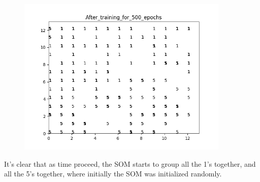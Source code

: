 \documentclass[11pt]{article}
\begin{document}
\begin{enumerate}
\begin{enumerate}
\begin{figure}[h!]
\begin{minipage}{0.45\textwidth}
    \end{minipage}\hfill
    \begin{minipage}{0.45\textwidth}
    	\centering
         \includegraphics[width=0.9\textwidth]{After_training_for_500_epochs}
    \end{minipage}\hfill
\end{figure}
It's clear that as time proceed, the SOM starts to group all the 1's together, and all the 5's together, where initially the SOM was initialized randomly.


\end{enumerate}
\end{enumerate}
\end{document}
